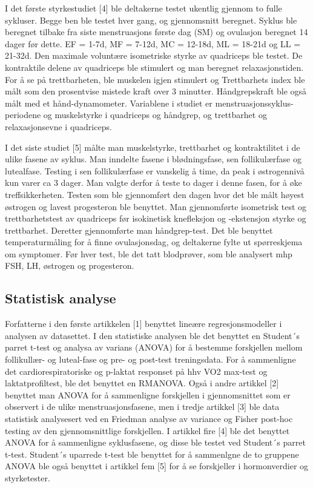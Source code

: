 \documentclass[
  letterpaper,
  DIV=11,
  numbers=noendperiod]{scrreprt}
\begin{document}
I det første styrkestudiet {[}4{]} ble deltakerne testet ukentlig
gjennom to fulle sykluser. Begge ben ble testet hver gang, og
gjennomsnitt beregnet. Syklus ble beregnet tilbake fra siste
menstruasjons første dag (SM) og ovulasjon beregnet 14 dager før dette.
EF = 1-7d, MF = 7-12d, MC = 12-18d, ML = 18-21d og LL = 21-32d. Den
maximale voluntære isometriske styrke av quadriceps ble testet. De
kontraktile delene av quadriceps ble stimulert og man beregnet
relaxasjonstiden. For å se på trettbarheten, ble muskelen igjen
stimulert og Trettbarhets index ble målt som den prosentvise mistede
kraft over 3 minutter. Håndgrepskraft ble også målt med et
hånd-dynamometer. Variablene i studiet er menstruasjonssyklus-periodene
og muskelstyrke i quadriceps og håndgrep, og trettbarhet og
relaxasjonsevne i quadriceps.

I det siste studiet {[}5{]} målte man muskelstyrke, trettbarhet og
kontraktilitet i de ulike fasene av syklus. Man inndelte fasene i
blødningsfase, sen follikulærfase og lutealfase. Testing i sen
follikulærfase er vanskelig å time, da peak i østrogennivå kun varer ca
3 dager. Man valgte derfor å teste to dager i denne fasen, for å øke
treffsikkerheten. Testen som ble gjennomført den dagen hvor det ble målt
høyest østrogen og lavest progesteron ble benyttet. Man gjennomførte
isometrisk test og trettbarhetstest av quadriceps før isokinetisk
knefleksjon og -ekstensjon styrke og trettbarhet. Deretter gjennomførte
man håndgrep-test. Det ble benyttet temperaturmåling for å finne
ovulasjonsdag, og deltakerne fylte ut spørreskjema om symptomer. Før
hver test, ble det tatt blodprøver, som ble analysert mhp FSH, LH,
østrogen og progesteron.

\hypertarget{statistisk-analyse}{%
\subsection{Statistisk analyse}\label{statistisk-analyse}}

Forfatterne i den første artikkelen {[}1{]} benyttet lineære
regresjonsmodeller i analysen av datasettet. I den statistiske analysen
ble det benyttet en Student´s parret t-test og analysa av varians
(ANOVA) for å bestemme forskjellen mellom follikullær- og luteal-fase og
pre- og post-test treningsdata. For å sammenligne det
cardiorespiratoriske og p-laktat responset på hhv VO2 max-test og
laktatprofiltest, ble det benyttet en RMANOVA. Også i andre artikkel
{[}2{]} benyttet man ANOVA for å sammenligne forskjellen i
gjennomsnittet som er observert i de ulike menstruasjonsfasene, men i
tredje artikkel {[}3{]} ble data statistisk analysesert ved en Friedman
analyse av variance og Fisher post-hoc testing av den gjennomsnittlige
forskjellen. I artikkel fire {[}4{]} ble det benyttet ANOVA for å
sammenligne syklusfasene, og disse ble testet ved Student´s parret
t-test. Student´s uparrede t-test ble benyttet for å sammenlgne de to
gruppene ANOVA ble også benyttet i artikkel fem {[}5{]} for å se
forskjeller i hormonverdier og styrketester.
\end{document}
